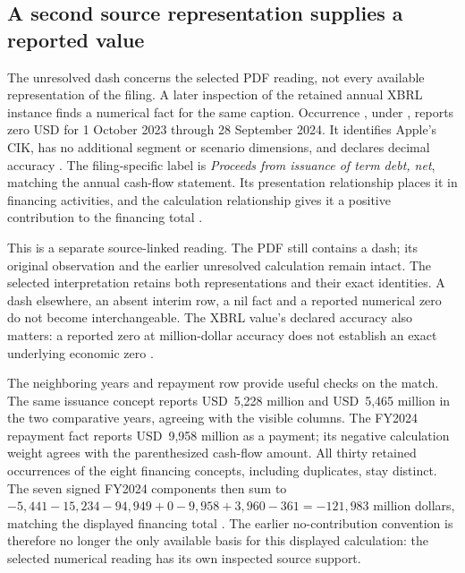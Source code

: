 \subsection{A second source representation supplies a reported value}
\label{sec:debt-selected-reading}

The unresolved dash concerns the selected PDF reading, not every available
representation of the filing. A later inspection of the retained annual XBRL
instance finds a numerical fact for the same caption. Occurrence
, under , reports zero
USD for 1 October 2023 through 28 September 2024. It identifies Apple's CIK,
has no additional segment or scenario dimensions, and declares decimal
accuracy . The filing-specific label is \emph{Proceeds from issuance of
term debt, net}, matching the annual cash-flow statement. Its presentation
relationship places it in financing activities, and the calculation
relationship gives it a positive contribution to the financing total
\citep[retained instance, occurrence f-325, context c-1; associated label,
presentation and calculation relationships]{apple2024xbrlinstance}.

This is a separate source-linked reading. The PDF still contains a dash;
its original observation and the earlier unresolved calculation remain intact.
The selected interpretation retains both representations and their exact
identities. A dash elsewhere, an absent interim row, a nil fact and a
reported numerical zero do not become interchangeable. The XBRL value's
declared accuracy also matters: a reported zero at million-dollar accuracy
does not establish an exact underlying economic zero
\citep[Component Fact, value and decimals properties]{xbrloim}.

The neighboring years and repayment row provide useful checks on the match.
The same issuance concept reports USD~5,228 million and USD~5,465 million in
the two comparative years, agreeing with the visible columns. The FY2024
repayment fact reports USD~9,958 million as a payment; its negative
calculation weight agrees with the parenthesized cash-flow amount. All
thirty retained occurrences of the eight financing concepts, including
duplicates, stay distinct. The seven signed FY2024 components then sum to
\(-5{,}441-15{,}234-94{,}949+0-9{,}958+3{,}960-361=-121{,}983\)
million dollars, matching the displayed financing total
\citep[p.~33]{apple2024}. The earlier no-contribution convention is therefore
no longer the only available basis for this displayed calculation: the
selected numerical reading has its own inspected source support.

